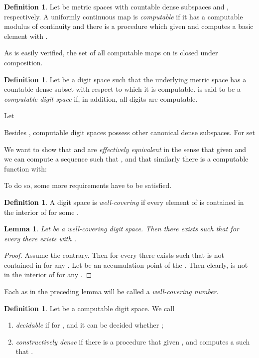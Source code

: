\documentclass[microtype]{jloganal}
\theoremstyle{plain}
\newtheorem{lemma}[theorem]{Lemma}
\theoremstyle{definition}
\newtheorem{definition}[theorem]{Definition}
\begin{document}
\begin{definition}
\label{def-dcomp}
Let  be metric spaces with countable dense subspaces  and , respectively. A uniformly continuous map  is \emph{computable} if it has a computable modulus of continuity and there is a procedure  which given  and  computes a basic element  with .
\end{definition}

As is easily verified, the set of all computable maps on  is closed under composition.

\begin{definition}\label{def-compdigsp}
Let  be a digit space such that the underlying metric space  has a countable dense subset  with respect to which it is computable.  is said to be a \emph{computable digit space} if, in addition, all digits  are computable.
\end{definition}

Let 


Besides , computable digit spaces possess other canonical dense subspaces. For  set
 
We want to show that  and  are \emph{effectively equivalent} in the sense that given  and  we can compute a sequence  such that , and that similarly there is a computable function  with:


To do so, some more requirements have to be satisfied.

\begin{definition}
\label{def-well-covering}
A digit space  is \emph{well-covering} if every element of  is
contained in the interior of  for some .
\end{definition}
\begin{lemma}
\label{lem-well-covering}
Let  be a well-covering digit space. Then there exists 
 such that for every  there exists  with
. 
\end{lemma}
\begin{proof}
Assume the contrary. Then for every  there exists  such
that  is not contained in  for any .
Let  be an accumulation point of the . Then clearly,  is not in the 
interior of  for any .
\end{proof}

Each  as in the preceding lemma will be called a \emph{well-covering number}. 

\begin{definition}
\label{def-deceffdense}
Let  be a computable digit space. We call 
\begin{enumerate}
\item\label{def-deceffdense-1}  \emph{decidable} if for ,  and  it can be decided whether ;

\item\label{def-deceffdense-2} \emph{constructively dense} if there is a procedure that given ,  and  computes a  such that .

\end{enumerate}
\end{definition}
\end{document}

